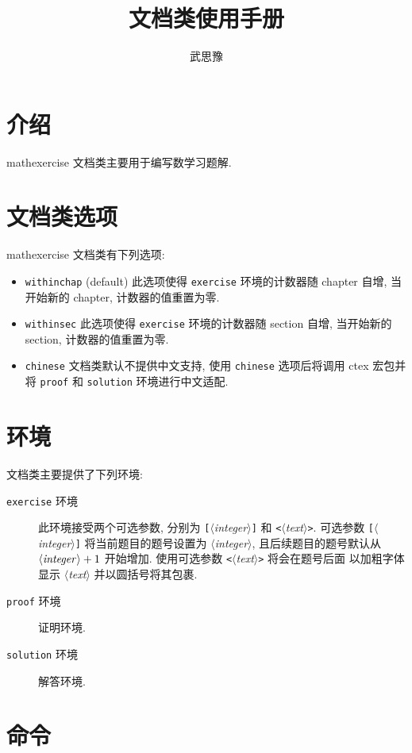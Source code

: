 \documentclass{article}
\title{\bfseries\cls{mathexercise} 文档类使用手册}
\author{武思豫}
\newcommand{\cls}[1]{\textsf{#1}}
\newcommand{\option}[1]{\texttt{#1}}
\newcommand{\env}[1]{\texttt{#1}}
\newcommand{\pkg}[1]{\textsf{#1}}
\newcommand{\meta}[1]{\mbox{$\langle$\it #1\/$\rangle$}}
\newcommand{\oargBracket}[1]{{\tt[}\meta{#1}{\tt]}}
\newcommand{\oargAngle}[1]{{\tt<}\meta{#1}{\tt>}}
\begin{document}
  
\maketitle

\section{介绍}

\cls{mathexercise} 文档类主要用于编写数学习题解.


\section{文档类选项}

\cls{mathexercise} 文档类有下列选项:
\begin{itemize}
  \item \option{withinchap} (default) 此选项使得 \env{exercise} 环境的计数器随 chapter 自增,
    当开始新的 chapter, 计数器的值重置为零.
  \item \option{withinsec} 此选项使得 \env{exercise} 环境的计数器随 section 自增,
    当开始新的 section, 计数器的值重置为零.
  \item \option{chinese} 文档类默认不提供中文支持, 使用 \option{chinese} 选项后将调用 \pkg{ctex}
    宏包并将 \env{proof} 和 \env{solution} 环境进行中文适配.
\end{itemize}


\section{环境}

文档类主要提供了下列环境:
\begin{description}
  \item [\env{exercise} 环境] 此环境接受两个可选参数, 分别为 \oargBracket{integer}
    和 \oargAngle{text}. 可选参数 \oargBracket{integer} 将当前题目的题号设置为 \meta{integer},
    且后续题目的题号默认从 $\meta{integer}+1$ 开始增加. 使用可选参数 \oargAngle{text} 将会在题号后面
    以加粗字体显示 \meta{text} 并以圆括号将其包裹.
  \item [\env{proof} 环境] 证明环境.
  \item [\env{solution} 环境] 解答环境.
\end{description}


\section{命令}
\end{document}
